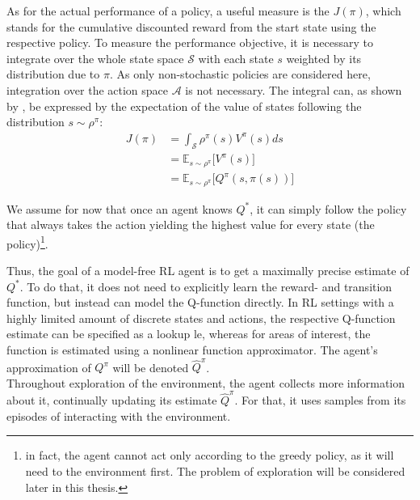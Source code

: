 As for the actual performance of a policy, a useful measure is the  $J(\pi)$, which stands for the cumulative discounted reward from the start state using the respective policy. To measure the performance objective, it is necessary to integrate over the whole state space $\mathcal{S}$ with each state $s$ weighted by its distribution due to $\pi$. As only non-stochastic policies are considered here, integration over the action space $\mathcal{A}$ is not necessary. The integral can, as shown by \cite{silver_deterministic_2014}, be expressed by the expectation of the value of states following the distribution $s\sim\rho^\pi$:
\begin{align}
	J(\pi) &= \int_\mathcal{S} \rho^\pi(s) V^\pi(s) ds \nonumber\\
	       &= \mathds{E}_{s\sim\rho^\pi} \big[V^\pi(s)] \nonumber\\
	       &= \mathds{E}_{s\sim\rho^\pi} \big[Q^\pi(s, \pi(s))] \label{eq:performance01}
\end{align}


\noindent We assume for now that once an agent knows $Q^*$, it can simply follow the policy that always takes the action yielding the highest value for every state (the  policy)\footnote{in fact, the agent cannot act only according to the greedy policy, as it will need to  the environment first. The problem of exploration will be considered later in this thesis.}. 

Thus, the goal of a model-free RL agent is to get a maximally precise estimate of $Q^*$. To do that, it does not need to explicitly learn the reward- and transition function, but instead can model the Q-function directly. In RL settings with a highly limited amount of discrete states and actions, the respective Q-function estimate can be specified as a lookup le, whereas for areas of interest, the function is estimated using a nonlinear function approximator. The agent's approximation of $Q^\pi$ will be denoted $\hat{Q}^\pi$. \\

\noindent Throughout exploration of the environment, the agent collects more information about it, continually updating its estimate $\hat{Q}^\pi$. For that, it uses samples from its episodes of interacting with the environment. %

